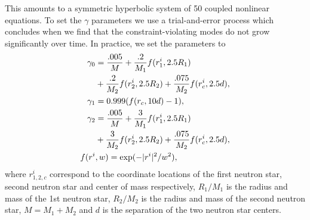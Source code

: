 %
%
%
This amounts to a symmetric hyperbolic system of 50 coupled nonlinear equations. To set the $\gamma$ parameters we use a trial-and-error process which concludes when we find that the constraint-violating modes do not grow significantly over time. In practice, we set the parameters to
%
\begin{align}
\gamma_0 &= \frac{.005}{M}+\frac{.2}{M_1}f(r^i_1, 2.5R_1)\notag\\
&+\frac{.2}{M_2}f(r^i_2, 2.5R_2)+\frac{.075}{M_2}f(r^i_c, 2.5d), \\
\gamma_1 &= 0.999 (f(r_c, 10d) - 1), \\
\gamma_2 &= \frac{.005}{M}+\frac{3}{M_1}f(r^i_1, 2.5R_1)\notag\\
&+\frac{3}{M_2}f(r^i_2, 2.5R_2)+\frac{.075}{M_2}f(r^i_c, 2.5d), \\
f(r^i&,w) = \exp(-|r^i|^2/w^2),
\end{align}
where $r^i_{1,2,c}$ correspond to the coordinate locations of the first neutron star, second neutron star and center of mass respectively, $R_1/M_1$ is the radius and mass of the 1st neutron star, $R_2/M_2$ is the radius and mass of the second neutron star, $M = M_1 + M_2$ and $d$ is the separation of the two neutron star centers.

